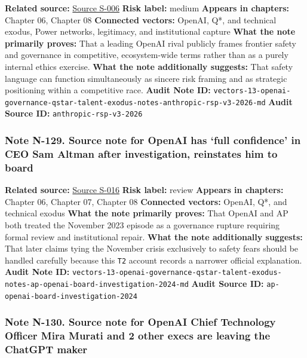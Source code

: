 \documentclass[
  american,
  11pt,
  letterpaper,
]{article}
\begin{document}
\textbf{Related source:}
\hyperref[source-s-006-anthropics-responsible-scaling-policy-version-30]{Source
S-006} \textbf{Risk label:} medium \textbf{Appears in chapters:} Chapter
06, Chapter 08 \textbf{Connected vectors:} OpenAI, Q*, and technical
exodus, Power networks, legitimacy, and institutional capture
\textbf{What the note primarily proves:} That a leading OpenAI rival
publicly frames frontier safety and governance in competitive,
ecosystem-wide terms rather than as a purely internal ethics exercise.
\textbf{What the note additionally suggests:} That safety language can
function simultaneously as sincere risk framing and as strategic
positioning within a competitive race. \textbf{Audit Note ID:}
\texttt{vectors-13-openai-governance-qstar-talent-exodus-notes-anthropic-rsp-v3-2026-md}
\textbf{Audit Source ID:} \texttt{anthropic-rsp-v3-2026}

\subsubsection{Note N-129. Source note for OpenAI has `full confidence'
in CEO Sam Altman after investigation, reinstates him to
board}\label{note-n-129-vectors-13-openai-governance-qstar-talent-exodus-notes-ap-openai-board-investigation-2024-md}

\textbf{Related source:}
\hyperref[source-s-016-openai-has-full-confidence-in-ceo-sam-altman-after-investigation-reinstates-him-to-board]{Source
S-016} \textbf{Risk label:} review \textbf{Appears in chapters:} Chapter
06, Chapter 07, Chapter 08 \textbf{Connected vectors:} OpenAI, Q*, and
technical exodus \textbf{What the note primarily proves:} That OpenAI
and AP both treated the November 2023 episode as a governance rupture
requiring formal review and institutional repair. \textbf{What the note
additionally suggests:} That later claims tying the November crisis
exclusively to safety fears should be handled carefully because this
\texttt{T2} account records a narrower official explanation.
\textbf{Audit Note ID:}
\texttt{vectors-13-openai-governance-qstar-talent-exodus-notes-ap-openai-board-investigation-2024-md}
\textbf{Audit Source ID:} \texttt{ap-openai-board-investigation-2024}

\subsubsection{Note N-130. Source note for OpenAI Chief Technology
Officer Mira Murati and 2 other execs are leaving the ChatGPT
maker}\label{note-n-130-vectors-13-openai-governance-qstar-talent-exodus-notes-ap-openai-murati-execs-depart-2024-md}
\end{document}
